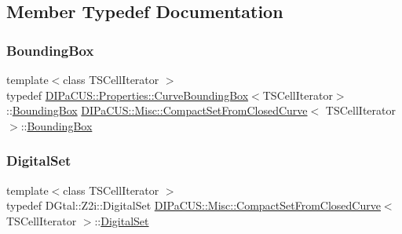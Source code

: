 \subsection{Member Typedef Documentation}
\mbox{\label{structDIPaCUS_1_1Misc_1_1CompactSetFromClosedCurve_abf35d4316dab4c7f1b2dd2e3b0f6115f}} 
\subsubsection{\texorpdfstring{Bounding\+Box}{BoundingBox}}
{\footnotesize\ttfamily template$<$class T\+S\+Cell\+Iterator $>$ \\
typedef \mbox{\hyperlink{structDIPaCUS_1_1Properties_1_1CurveBoundingBox}{D\+I\+Pa\+C\+U\+S\+::\+Properties\+::\+Curve\+Bounding\+Box}}$<$T\+S\+Cell\+Iterator$>$\+::\mbox{\hyperlink{structDIPaCUS_1_1Misc_1_1CompactSetFromClosedCurve_abf35d4316dab4c7f1b2dd2e3b0f6115f}{Bounding\+Box}} \mbox{\hyperlink{structDIPaCUS_1_1Misc_1_1CompactSetFromClosedCurve}{D\+I\+Pa\+C\+U\+S\+::\+Misc\+::\+Compact\+Set\+From\+Closed\+Curve}}$<$ T\+S\+Cell\+Iterator $>$\+::\mbox{\hyperlink{structDIPaCUS_1_1Misc_1_1CompactSetFromClosedCurve_abf35d4316dab4c7f1b2dd2e3b0f6115f}{Bounding\+Box}}}

\mbox{\label{structDIPaCUS_1_1Misc_1_1CompactSetFromClosedCurve_a47e3100b4196961a629785d14f6ad645}} 
\subsubsection{\texorpdfstring{Digital\+Set}{DigitalSet}}
{\footnotesize\ttfamily template$<$class T\+S\+Cell\+Iterator $>$ \\
typedef D\+Gtal\+::\+Z2i\+::\+Digital\+Set \mbox{\hyperlink{structDIPaCUS_1_1Misc_1_1CompactSetFromClosedCurve}{D\+I\+Pa\+C\+U\+S\+::\+Misc\+::\+Compact\+Set\+From\+Closed\+Curve}}$<$ T\+S\+Cell\+Iterator $>$\+::\mbox{\hyperlink{structDIPaCUS_1_1Misc_1_1CompactSetFromClosedCurve_a47e3100b4196961a629785d14f6ad645}{Digital\+Set}}}


